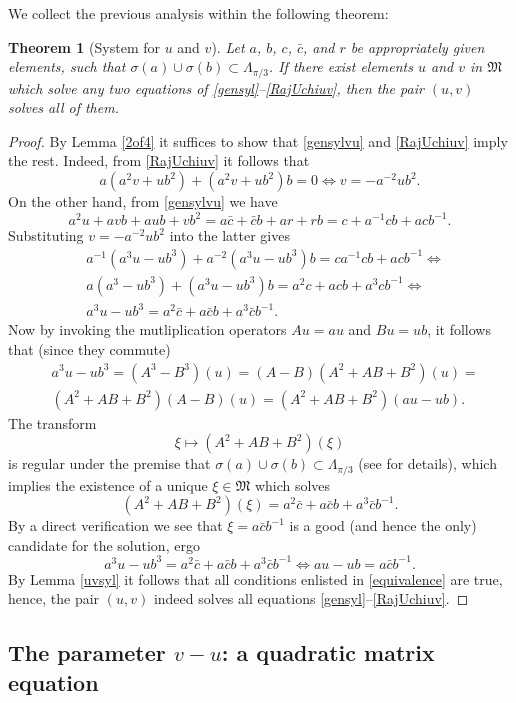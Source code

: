 \documentclass{article}
\newtheorem{theorem}{Theorem}[section]
\theoremstyle{definition}
\def\M{\mathfrak{M}}
\begin{document}
We  collect the previous analysis within the following theorem: 
\begin{theorem}[System for $u$ and $v$]\label{4of2} Let $a$, $b$, $c$, $\bar{c}$, and $r$ be appropriately given elements, such that $\sigma(a)\cup\sigma(b)\subset\Lambda_{\pi/3}$. If there exist elements $u$ and $v$ in $\M$ which solve any two equations of \eqref{gensyl}--\eqref{RajUchiuv}, then the pair $(u,v)$ solves all of them.
\end{theorem}

\begin{proof} By Lemma \ref{2of4} it suffices to show that \eqref{gensylvu} and \eqref{RajUchiuv} imply the rest. Indeed, from \eqref{RajUchiuv} it follows that
$$a(a^2v+ub^2)+(a^2v+ub^2)b=0\Leftrightarrow v=-a^{-2}ub^2.$$
On the other hand, from \eqref{gensylvu} we have 
$$a^2u+avb+aub+vb^2=a\bar{c}+\bar{c}b+ar+rb=c+a^{-1}cb+acb^{-1}.$$
Substituting $v=-a^{-2}ub^{2}$ into the latter gives
$$\begin{aligned}&a^{-1}(a^3u-ub^3)+a^{-2}(a^3u-ub^3)b=ca^{-1}cb+acb^{-1}\Leftrightarrow \\
&a(a^3-ub^3)+(a^3u-ub^3)b=a^2c+acb+a^3cb^{-1}\Leftrightarrow\\
&a^3u-ub^3=a^2\bar{c}+a\bar{c}b+a^3\bar{c}b^{-1}.
\end{aligned}$$
Now by invoking the mutliplication operators $Au=au$ and $Bu=ub$, it follows that (since they commute)
$$\begin{aligned}&a^3u-ub^3=(A^3-B^3)(u)=(A-B)(A^2+AB+B^2)(u)=\\
&(A^2+AB+B^2)(A-B)(u)=(A^2+AB+B^2)(au-ub).
\end{aligned}$$
The transform 
$$\xi\mapsto (A^2+AB+B^2)(\xi)$$
is regular under the premise that $\sigma(a)\cup\sigma(b)\subset\Lambda_{\pi/3}$ (see \cite{RBMU} for details), which implies the existence of a unique $\xi\in\M$ which solves
$$(A^2+AB+B^2)(\xi)=a^2\bar{c}+a\bar{c}b+a^3\bar{c}b^{-1}.$$
By a direct verification we see that $\xi=a\bar{c}b^{-1}$ is a good (and hence the only) candidate for the solution, ergo
$$a^3u-ub^3=a^2\bar{c}+a\bar{c}b+a^3\bar{c}b^{-1}\Leftrightarrow au-ub=a\bar{c}b^{-1}.$$
By Lemma \ref{uvsyl} it follows that all conditions enlisted in \eqref{equivalence} are true, hence, the pair $(u,v)$ indeed solves all equations \eqref{gensyl}--\eqref{RajUchiuv}.
\end{proof}

\subsection{The parameter $v-u$: a quadratic matrix equation}
\end{document}

